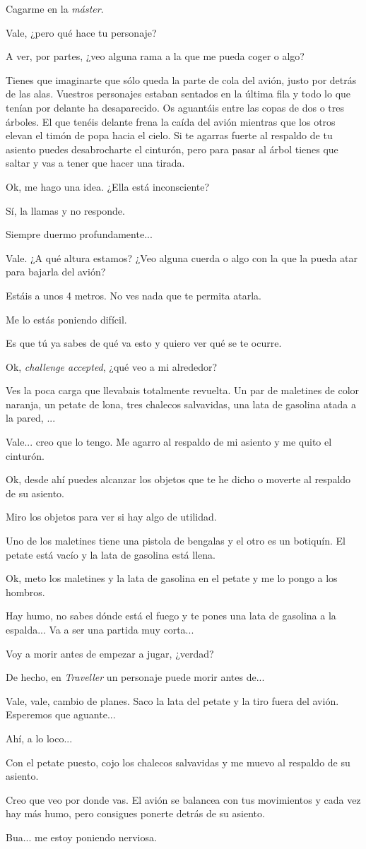 \documentclass[10pt, a5paper, twocolumn]{article}
\newenvironment{dialogue}
    {\begin{description}[leftmargin=!,align=right,labelwidth=0.cm]}
    {\end{description}}
\newcommand\A{\item[\raisebox{-0.25em}{\scalebox{0.75}{\bctetraedre}}]}
\newcommand\B{\item[\raisebox{-0.25em}{\scalebox{0.75}{\bccube}}]}
\newcommand\E{\item[\raisebox{-0.25em}{\scalebox{0.75}{\bcicosaedre}}]}
\begin{document}
\begin{dialogue}
        \B Cagarme en la \emph{máster}.
        \E Vale, ¿pero qué hace tu personaje?
        \B A ver, por partes, ¿veo alguna rama a la que me pueda coger o algo?
        \E Tienes que imaginarte que sólo queda la parte de cola del avión, justo por detrás de las alas. Vuestros personajes estaban sentados en la última fila y todo lo que tenían por delante ha desaparecido. Os aguantáis entre las copas de dos o tres árboles. El que tenéis delante frena la caída del avión mientras que los otros elevan el timón de popa hacia el cielo. Si te agarras fuerte al respaldo de tu asiento puedes desabrocharte el cinturón, pero para pasar al árbol tienes que saltar y vas a tener que hacer una tirada.
        \B Ok, me hago una idea. ¿Ella está inconsciente?
        \E Sí, la llamas y no responde.
        \A Siempre duermo profundamente...
        \B Vale. ¿A qué altura estamos? ¿Veo alguna cuerda o algo con la que la pueda atar para bajarla del avión?
        \E Estáis a unos 4 metros. No ves nada que te permita atarla.
        \B Me lo estás poniendo difícil.
        \E Es que tú ya sabes de qué va esto y quiero ver qué se te ocurre.
        \B Ok, \emph{challenge accepted}, ¿qué veo a mi alrededor?
        \E Ves la poca carga que llevabais totalmente revuelta. Un par de maletines de color naranja, un petate de lona, tres chalecos salvavidas, una lata de gasolina atada a la pared, ...
        \B Vale... creo que lo tengo. Me agarro al respaldo de mi asiento y me quito el cinturón.
        \E Ok, desde ahí puedes alcanzar los objetos que te he dicho o moverte al respaldo de su asiento.
        \B Miro los objetos para ver si hay algo de utilidad.
        \E Uno de los maletines tiene una pistola de bengalas y el otro es un botiquín. El petate está vacío y la lata de gasolina está llena.
        \B Ok, meto los maletines y la lata de gasolina en el petate y me lo pongo a los hombros.
        \E Hay humo, no sabes dónde está el fuego y te pones una lata de gasolina a la espalda... Va a ser una partida muy corta...
        \A Voy a morir antes de empezar a jugar, ¿verdad?
        \E De hecho, en \emph{Traveller} un personaje puede morir antes de...
        \B Vale, vale, cambio de planes. Saco la lata del petate y la tiro fuera del avión. Esperemos que aguante...
        \E Ahí, a lo loco...
        \B Con el petate puesto, cojo los chalecos salvavidas y me muevo al respaldo de su asiento.
        \E Creo que veo por donde vas. El avión se balancea con tus movimientos y cada vez hay más humo, pero consigues ponerte detrás de su asiento.
        \A Bua... me estoy poniendo nerviosa.

\end{dialogue}
\end{document}

